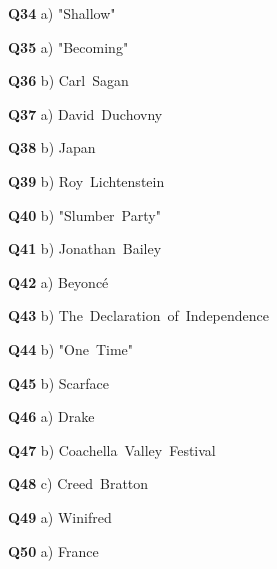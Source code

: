 \textbf{Q34} a) "Shallow"\par
\textbf{Q35} a) "Becoming"\par
\textbf{Q36} b) Carl Sagan\par
\textbf{Q37} a) David Duchovny\par
\textbf{Q38} b) Japan\par
\textbf{Q39} b) Roy Lichtenstein\par
\textbf{Q40} b) "Slumber Party"\par
\textbf{Q41} b) Jonathan Bailey\par
\textbf{Q42} a) Beyoncé\par
\textbf{Q43} b) The Declaration of Independence\par
\textbf{Q44} b) "One Time"\par
\textbf{Q45} b) Scarface\par
\textbf{Q46} a) Drake\par
\textbf{Q47} b) Coachella Valley Festival\par
\textbf{Q48} c) Creed Bratton\par
\textbf{Q49} a) Winifred\par
\textbf{Q50} a) France\par